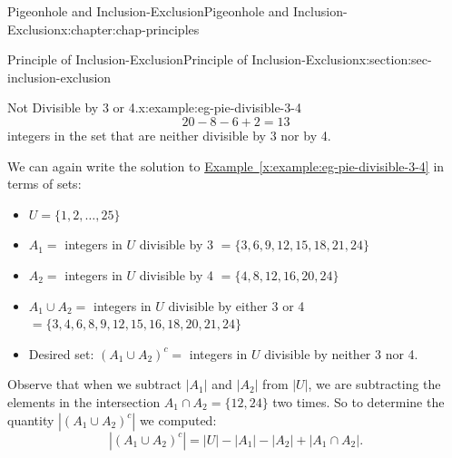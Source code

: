 \documentclass[oneside,10pt,]{book}
\newcommand{\xreffont}{\relax}
\numberwithin{equation}{section}
\begin{document}
\begin{chapterptx}{Pigeonhole and Inclusion-Exclusion}{}{Pigeonhole and Inclusion-Exclusion}{}{}{x:chapter:chap-principles}
\begin{sectionptx}{Principle of Inclusion-Exclusion}{}{Principle of Inclusion-Exclusion}{}{}{x:section:sec-inclusion-exclusion}
\begin{example}{Not Divisible by 3 or 4.}{x:example:eg-pie-divisible-3-4}
\begin{equation*}
20 - 8 - 6 + 2 = 13
\end{equation*}
integers in the set that are neither divisible by 3 nor by 4.%
\end{example}
We can again write the solution to \hyperref[x:example:eg-pie-divisible-3-4]{Example~{\xreffont\ref{x:example:eg-pie-divisible-3-4}}} in terms of sets:%
\begin{itemize}[label=\textbullet]
\item{}\(\displaystyle U = \{1,2,\ldots,25\}\)%
\item{}\(A_1 = \) integers in \(U\) divisible by 3 \(= \{3,6,9,12,15,18,21,24\}\)%
\item{}\(A_2 = \) integers in \(U\) divisible by 4 \(= \{4,8,12,16,20,24\}\)%
\item{}\(A_1 \cup A_2 = \) integers in \(U\) divisible by either 3 or 4 \(= \{3,4,6,8,9,12,15,16,18,20,21,24\}\)%
\item{}Desired set: \((A_1 \cup A_2)^c = \) integers in \(U\) divisible by neither 3 nor 4.%
\end{itemize}
%
\begin{sidebyside}{1}{0.25}{0.25}{0}%
\begin{sbspanel}{0.5}%
%
\end{sbspanel}%
\end{sidebyside}%
\par
Observe that when we subtract \(|A_1|\) and \(|A_2|\) from \(|U|\), we are subtracting the elements in the intersection \(A_1 \cap A_2 = \{12, 24\}\) two times. So to determine the quantity \(|(A_1 \cup A_2)^c|\) we computed:%
\begin{equation*}
|(A_1 \cup A_2)^c| = |U| - |A_1| - |A_2| + |A_1 \cap A_2|\text{.}

\end{equation*}
\end{sectionptx}
\end{chapterptx}
\end{document}
